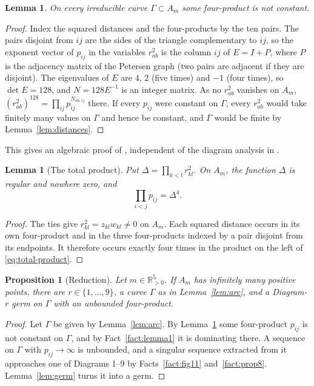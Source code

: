 \documentclass[11pt]{amsart}
\newtheorem{proposition}[theorem]{Proposition}
\newtheorem{lemma}[theorem]{Lemma}
\theoremstyle{definition}
\theoremstyle{remark}
\newcommand{\Rp}{\mathbb{R}_{>0}}
\begin{document}
\begin{lemma}\label{lem:petersen}
On every irreducible curve $\Gamma\subset A_m$ some four-product is not constant.
\end{lemma}
\begin{proof}
Index the squared distances and the four-products by the ten pairs.  The pairs disjoint from
$ij$ are the sides of the triangle complementary to $ij$, so the exponent vector of $p_{ij}$ in
the variables $r_{ab}^2$ is the column $ij$ of $E=I+P$, where $P$ is the adjacency matrix of the
Petersen graph (two pairs are adjacent if they are disjoint).  The eigenvalues of $E$ are $4$,
$2$ (five times) and $-1$ (four times), so $\det E=128$, and $N=128E^{-1}$ is an integer
matrix.  As no $r_{ab}^2$ vanishes on $A_m$, $(r_{ab}^2)^{128}=\prod_{ij}p_{ij}^{N_{ab,ij}}$ there.
If every $p_{ij}$ were constant on $\Gamma$, every $r_{ab}^2$ would take finitely many values on
$\Gamma$ and hence be constant, and $\Gamma$ would be finite by Lemma~\ref{lem:distances}.
\end{proof}
This gives an algebraic proof of \cite[Prop.~9]{AK}, independent of the diagram analysis in
\cite[Fig.~11]{AK}.

{
\begin{lemma}[The total product]\label{lem:total-product}
Put $\Delta=\prod_{k<l}r_{kl}^2$.  On $A_m$, the function $\Delta$ is regular and nowhere zero,
and
\begin{equation}\label{eq:total-product}
  \prod_{i<j}p_{ij}=\Delta^4.
\end{equation}
\end{lemma}
\begin{proof}
The ties give $r_{kl}^2=z_{kl}w_{kl}\ne0$ on $A_m$.  Each squared distance occurs in its own
four-product and in the three four-products indexed by a pair disjoint from its endpoints.
It therefore occurs exactly four times in the product on the left of \eqref{eq:total-product}.
\end{proof}
}

\begin{proposition}[Reduction]\label{prop:reduction}
Let $m\in\Rp^5$.  If $A_m$ has infinitely many positive points, there are $r\in\{1,\dots,9\}$, a
curve $\Gamma$ as in Lemma~\ref{lem:arc}, and a Diagram-$r$ germ on $\Gamma$ with an unbounded
four-product.
\end{proposition}

\begin{proof}
Let $\Gamma$ be given by Lemma~\ref{lem:arc}.  By Lemma~\ref{lem:petersen} some four-product
$p_{ij}$ is not constant on $\Gamma$, and by Fact~\ref{fact:lemma1} it is dominating there.  A
sequence on $\Gamma$ with $p_{ij}\to\infty$ is unbounded, and a singular sequence extracted from
it approaches one of Diagrams 1--9 by Facts~\ref{fact:fig11} and~\ref{fact:prop8}.
Lemma~\ref{lem:germ} turns it into a germ.
\end{proof}
\end{document}
